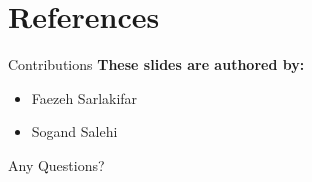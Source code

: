 \documentclass[serif, aspectratio=169]{beamer}
\begin{document}


\section{References}

\begin{frame}[allowframebreaks]
    
    
    \nocite{*} %
\end{frame}

\begin{frame}{Contributions}
	\textbf{These slides are authored by:}
	\begin{itemize}
 		\item Faezeh Sarlakifar
		\item Sogand Salehi
	\end{itemize}
	    
\end{frame}
\begin{frame}
    \begin{center}
        {\Huge Any Questions?}
    \end{center}
\end{frame}
\end{document}
